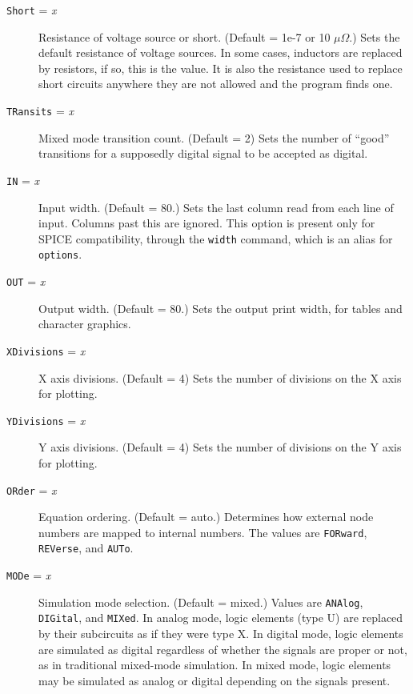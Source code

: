 \begin{description}
\item[{\tt Short} = {\it x}] Resistance of voltage source or
short.  (Default = 1e-7 or 10 $\mu\Omega$.)  Sets the default
resistance of voltage sources.  In some cases, inductors are
replaced by resistors, if so, this is the value.  It is also
the resistance used to replace short circuits anywhere they are
not allowed and the program finds one.

\item[{\tt TRansits} = {\it x}] Mixed mode transition count. (Default = 2)
Sets the number of ``good'' transitions for a supposedly digital signal
to be accepted as digital.

\item[{\tt IN} = {\it x}] Input width.  (Default = 80.)
Sets the last column read from each line of input.  Columns
past this are ignored.  This option is present only for SPICE
compatibility, through the {\tt width} command, which is an
alias for {\tt options}.

\item[{\tt OUT} = {\it x}] Output width.  (Default = 80.)
Sets the output print width, for tables and character graphics.

\item[{\tt XDivisions} = {\it x}]  X axis divisions. (Default = 4)
Sets the number of divisions on the X axis for plotting.

\item[{\tt YDivisions} = {\it x}]  Y axis divisions. (Default = 4)
Sets the number of divisions on the Y axis for plotting.

\item[{\tt ORder} = {\it x}] Equation ordering.  (Default = auto.)
Determines how external node numbers are mapped to internal numbers.  The
values are {\tt FORward}, {\tt REVerse}, and {\tt AUTo}.

\item[{\tt MODe} = {\it x}] Simulation mode selection.  (Default = mixed.)
Values are {\tt ANAlog}, {\tt DIGital}, and {\tt MIXed}.  In analog mode,
logic elements (type U) are replaced by their subcircuits as if they were
type X.  In digital mode, logic elements are simulated as digital regardless
of whether the signals are proper or not, as in traditional mixed-mode
simulation.  In mixed mode, logic elements may be simulated as analog or
digital depending on the signals present.


\end{description}

